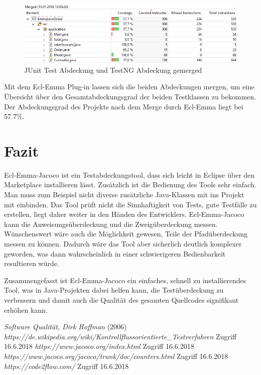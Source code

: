 \documentclass[a4paper]{article}
\begin{document}
\begin{figure}[h]
\includegraphics[scale=0.6]{Merged_Abdeckung.png}
\caption{JUnit Test Abdeckung und TestNG Abdeckung gemerged}
\centering
\end{figure}
Mit dem Ecl-Emma Plug-in lassen sich die beiden Abdeckungen mergen, um eine Übersicht über den Gesamtabdeckungsgrad der beiden Testklassen zu bekommen. Der Abdeckungsgrad des Projekts nach dem Merge durch Ecl-Emma liegt bei 57.7\%. 
\newpage
\section{Fazit}
Ecl-Emma-Jacoco ist ein Testabdeckungstool, dass sich leicht in Eclipse über den Marketplace installieren lässt. Zusätzlich ist die Bedienung des Tools sehr einfach.
Man muss zum Beispiel nicht diverse zusätzliche Java-Klassen mit ins Projekt mit einbinden. Das Tool prüft nicht die Sinnhaftigkeit von Tests, gute Testfälle zu erstellen, liegt daher weiter in den Händen des Entwicklers.
Ecl-Emma-Jacoco kann die Anweisungsüberdeckung und die Zweigüberdeckung messen. Wünschenswert wäre auch die Möglichkeit gewesen, Teile der Pfadüberdeckung messen zu können. Dadurch wäre das Tool aber sicherlich deutlich 
komplexer geworden, was dann wahrscheinlich in einer schwierigeren Bedienbarkeit resultieren würde. 
\par
Zusammengefasst ist Ecl-Emma-Jacoco ein einfaches, schnell zu installierendes Tool, was in Java-Projekten dabei helfen kann, die Testüberdeckung zu verbessern und damit auch die Qualität des gesamten Quellcodes signifikant erhöhen kann.
\begin{thebibliography}{1}
	 \emph{Software Qualität, Dirk Hoffman} (2006)
	 \emph{https://de.wikipedia.org/wiki/Kontrollflussorientierte\_Testverfahren} Zugriff 16.6.2018
	 \emph{https://www.jacoco.org/index.html} Zugriff 16.6.2018
	 \emph{https://www.jacoco.org/jacoco/trunk/doc/counters.html} Zugriff 16.6.2018
	 \emph{https://code2flow.com/} Zugriff 16.6.2018
\end{thebibliography}
\end{document}

